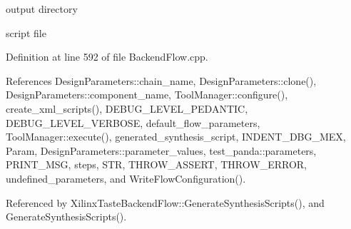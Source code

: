 output directory

script file 

Definition at line 592 of file Backend\+Flow.\+cpp.



References Design\+Parameters\+::chain\+\_\+name, Design\+Parameters\+::clone(), Design\+Parameters\+::component\+\_\+name, Tool\+Manager\+::configure(), create\+\_\+xml\+\_\+scripts(), D\+E\+B\+U\+G\+\_\+\+L\+E\+V\+E\+L\+\_\+\+P\+E\+D\+A\+N\+T\+IC, D\+E\+B\+U\+G\+\_\+\+L\+E\+V\+E\+L\+\_\+\+V\+E\+R\+B\+O\+SE, default\+\_\+flow\+\_\+parameters, Tool\+Manager\+::execute(), generated\+\_\+synthesis\+\_\+script, I\+N\+D\+E\+N\+T\+\_\+\+D\+B\+G\+\_\+\+M\+EX, Param, Design\+Parameters\+::parameter\+\_\+values, test\+\_\+panda\+::parameters, P\+R\+I\+N\+T\+\_\+\+M\+SG, steps, S\+TR, T\+H\+R\+O\+W\+\_\+\+A\+S\+S\+E\+RT, T\+H\+R\+O\+W\+\_\+\+E\+R\+R\+OR, undefined\+\_\+parameters, and Write\+Flow\+Configuration().



Referenced by Xilinx\+Taste\+Backend\+Flow\+::\+Generate\+Synthesis\+Scripts(), and Generate\+Synthesis\+Scripts().

